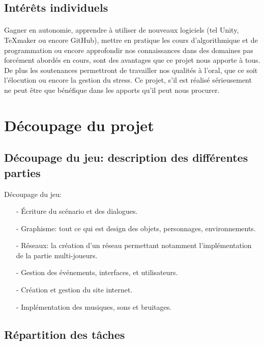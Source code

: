 \documentclass[12pt,a4paper]{article}
\begin{document}
\subsection{Intérêts individuels}
\paragraph{}
Gagner en autonomie, apprendre à utiliser de nouveaux logiciels (tel Unity, TeXmaker ou encore GitHub), mettre en pratique les cours d'algorithmique et de programmation ou encore approfondir nos connaissances dans des domaines pas forcément abordés en cours, sont des avantages que ce projet nous apporte à tous.
De plus les soutenances permettront de travailler nos qualités à l'oral, que ce soit l'élocution ou encore la gestion du stress. Ce projet, s'il est réalisé sérieusement ne peut être que bénéfique dans les apports qu'il peut nous procurer.

\newpage
\section{Découpage du projet}
\subsection{Découpage du jeu: description des différentes \newline parties}
Découpage du jeu:
\begin{itemize}
\item[-] Écriture du scénario et des dialogues.
\item[-] Graphisme: tout ce qui est design des objets, personnages, environnements.
\item[-] Réseaux: la création d'un réseau permettant notamment l'implémentation de la partie multi-joueurs.
\item[-] Gestion des événements, interfaces, et utilisateurs.
\item[-] Création et gestion du site internet.
\item[-] Implémentation des musiques, sons et bruitages.
\end{itemize}
\newpage
\subsection{Répartition des tâches}
\end{document}
